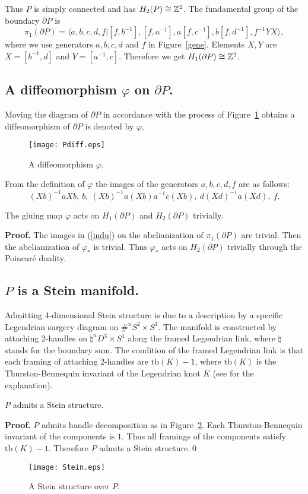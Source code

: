 \documentclass[11pt]{amsart}
\begin{document}
Thus $P$ is simply connected and has $H_2(P)\cong {\Bbb Z}^2$.
The fundamental group of the boundary $\partial P$ is
$$\pi_1(\partial P)=\langle a,b,c,d,f|[f,b^{-1}],[f,a^{-1}],a[f,c^{-1}],b[f,d^{-1}],f^{-1}YX\rangle,$$
where we use generators $a,b,c,d$ and $f$ in Figure~\ref{gene}.
Elements $X,Y$ are $X=[b^{-1},d]$ and $Y=[a^{-1},c]$.
Therefore we get $H_1(\partial P)\cong{\Bbb Z}^2$.

\subsection{A diffeomorphism $\varphi$ on $\partial P$.}
Moving the diagram of $\partial P$ in accordance with the process of Figure~\ref{Pdiff}
obtains a diffeomorphism of $\partial P$ is denoted by $\varphi$.
\begin{figure}[htbp]
\begin{center}
\texttt{[image: Pdiff.eps]}
\caption{A diffeomorphism $\varphi$.}
\label{Pdiff}
\end{center}
\end{figure}

From the definition of $\varphi$ the images of the generators $a,b,c,d,f$ are as follows:
\begin{equation}\label{indu}
(Xb)^{-1}aXb,\ b,\ (Xb)^{-1}a(Xb)a^{-1}c(Xb),\ d(Xd)^{-1}a(Xd),\ f.
\end{equation}

\begin{lem}
The gluing map $\varphi$ acts on $H_1(\partial P)$ and $H_2(\partial P)$ trivially.
\end{lem}
{{\bf Proof. }}
The images in (\ref{indu}) on the abelianization of $\pi_1(\partial P)$ are trivial.
Then the abelianization of $\varphi_\ast$ is trivial.
Thus $\varphi_\ast$ acts on $H_2(\partial P)$ trivially through the Poincar\'e duality.

\subsection{$P$ is a Stein manifold.}
Admitting 4-dimensional Stein structure is due to a description by a specific Legendrian surgery diagram on $\#^nS^2\times S^1$.
The manifold is constructed by attaching 2-handles on $\natural^nD^3\times S^1$ along the framed Legendrian link,
where $\natural$ stands for the boundary sum.
The condition of the framed Legendrian link is that each framing of attaching 2-handles are $\text{tb}(K)-1$,
where $\text{tb}(K)$ is the Thurston-Bennequin invariant of the Legendrian knot $K$
(see \cite{[GS]} for the explanation).
\begin{prop}
\label{stein}
$P$ admits a Stein structure.
\end{prop}
{{\bf Proof. }}
$P$ admits handle decomposition as in Figure~\ref{PStein}.
Each Thurston-Bennequin invariant of the components is $1$.
Thus all framings of the components satisfy $\text{tb}(K)-1$.
Therefore $P$ admits a Stein structure.\qed
\begin{figure}[ht]
\begin{center}
\texttt{[image: Stein.eps]}
\caption{A Stein structure over $P$.}
\label{PStein}
\end{center}
\end{figure}
\end{document}
